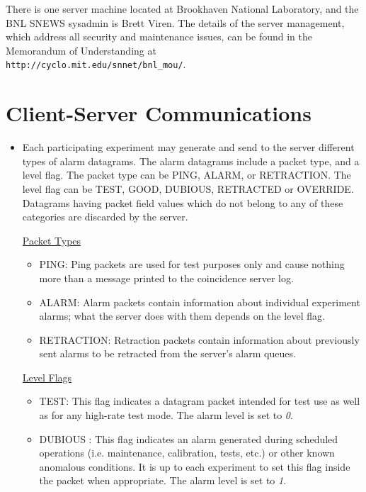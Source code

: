 \documentclass{article}
\begin{document}
There is one server machine located at Brookhaven
National Laboratory, and the BNL SNEWS sysadmin is Brett Viren.
The details of the server management, which address all
security and maintenance issues, can be found
in the Memorandum of Understanding at\\
{\tt http://cyclo.mit.edu/snnet/bnl\_mou/}.

\section{Client-Server Communications}\label{alarm}
\begin{itemize}

\item Each participating experiment may generate and send to the server
different types of alarm datagrams.
The alarm datagrams include a packet type, and a level flag.
The packet type can be PING, ALARM, or RETRACTION.
The level flag can be TEST, GOOD, DUBIOUS, RETRACTED or OVERRIDE.  
Datagrams having packet field values which do not 
belong to any of these categories are discarded by the server.

\noindent \underline{Packet Types}

\begin{itemize}
\item PING: Ping packets are used for test purposes only
and cause nothing more than a message printed to the coincidence
server log.

\item ALARM: Alarm packets contain information about individual
experiment alarms; what the server does with them depends on the
level flag.

\item RETRACTION:  Retraction packets contain information about
previously sent alarms to be retracted from the server's alarm queues.

\end{itemize}

\noindent \underline{Level Flags}

\begin{itemize}

\item TEST: This flag indicates a datagram packet intended for test use
as well as for any high-rate test mode.  The alarm level
is set to {\it 0}.

\item DUBIOUS : This flag indicates an alarm
generated during scheduled operations (i.e. maintenance, calibration,
tests, etc.) or other known anomalous conditions. It is up to each
experiment to set this flag inside the packet when appropriate.  The
alarm level is set to {\it 1}.


\end{itemize}
\end{itemize}
\end{document}
